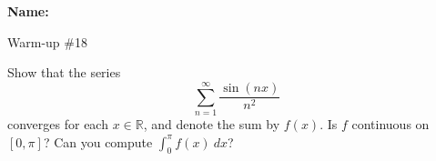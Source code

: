 \documentclass[12pt]{article}
\begin{document}
\noindent \textbf{Name:} 

\begin{center}
Warm-up \#18
\end{center}

\noindent Show that the series 
\[
\sum_{n = 1}^\infty \frac{\sin(nx)}{n^2}
\]
converges for each $x \in \mathbb{R}$, and denote the sum by $f(x)$. Is $f$ continuous on $[0,\pi]$? Can you compute $\int_0^\pi f(x) \: dx$?  
\end{document}
